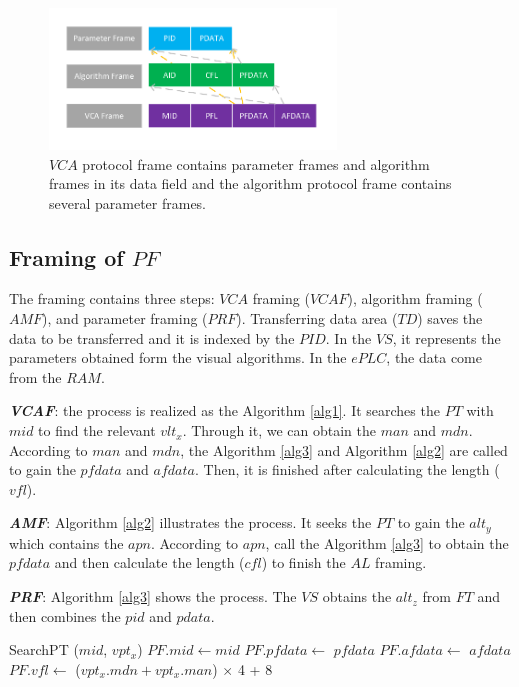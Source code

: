 \documentclass[journal,UTF8]{IEEEtran}
\begin{document}
\begin{figure}
	\centering
	\includegraphics[width=3in]{fig/Protocol.pdf}
	\caption{ $VCA$ protocol frame contains parameter frames and algorithm frames in its data field and the algorithm protocol frame contains several parameter frames.}
	\label{fig:Protocol}
\end{figure}
\subsection{Framing of $PF$}
The framing contains three steps: $VCA$ framing ($VCAF$), algorithm framing ($AMF$), and parameter framing ($PRF$). Transferring data area ($TD$) saves the data to be transferred and it is indexed by the $PID$. In the $VS$, it represents the parameters obtained form the visual algorithms. In the $ePLC$, the data come from the $RAM$.   


\textbf{\emph{VCAF}}: the process is realized as the Algorithm \ref{alg1}. It searches the $PT$ with $mid$ to find the relevant $vlt_x$. Through it, we can obtain the $man$ and $mdn$. According to $man$ and $mdn$, the Algorithm \ref{alg3} and Algorithm \ref{alg2} are called to gain the $pfdata$ and $afdata$. Then, it is finished after calculating the length ($vfl$).

\textbf{\emph{AMF}}: Algorithm \ref{alg2} illustrates the process. It seeks the $PT$ to gain the $alt_y$ which contains the $apn$. According to $apn$, call the Algorithm \ref{alg3} to obtain the $pfdata$ and then calculate the length ($cfl$) to finish the $AL$ framing.  

\textbf{\emph{PRF}}: Algorithm \ref{alg3} shows the process. The $VS$ obtains the $alt_z$ from $FT$ and then combines the $pid$ and $pdata$.


\begin{algorithm}
	\label{alg1}
	\caption{$VCAF$}%
	SearchPT ($mid$, $vpt_x$)\;
	$PF.mid\leftarrow mid$\; 
    $PF.pfdata\leftarrow$ $pfdata$\; 
    $PF.afdata\leftarrow$ $afdata$\; 
	$PF.vfl\leftarrow$ ($vpt_x.mdn+vpt_x.man$) $\times$ 4 + 8\;
\end{algorithm}
\end{document}
